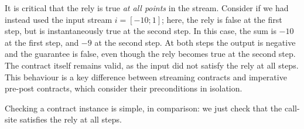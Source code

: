 It is critical that the rely is true \emph{at all points} in the stream.
Consider if we had instead used the input stream $\textit{i} = [-10; 1]$; here, the rely is false at the first step, but is instantaneously true at the second step.
In this case, the sum is $-10$ at the first step, and $-9$ at the second step.
At both steps the output is negative and the guarantee is false, even though the rely becomes true at the second step.
The contract itself remains valid, as the input did not satisfy the rely at all steps.
This behaviour is a key difference between streaming contracts and imperative pre-post contracts, which consider their preconditions in isolation.

Checking a contract instance is simple, in comparison: we just check that the call-site satisfies the rely at all steps.




